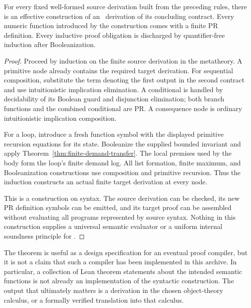 \begin{theorem}
\label{thm:syntactic-compilation}
For every fixed well-formed source derivation built from the preceding rules,
there is an effective construction of an \ipra\ derivation of its concluding
contract.  Every numeric function introduced by the construction comes with
a finite PR definition.  Every inductive proof obligation is discharged by
quantifier-free induction after Booleanization.
\end{theorem}

\begin{proof}
Proceed by induction on the finite source derivation in the metatheory.
A primitive node already contains the required target derivation.  For
sequential composition, substitute the term denoting the first output in the
second contract and use intuitionistic implication elimination.  A
conditional is handled by decidability of its Boolean guard and disjunction
elimination; both branch functions and the combined conditional are PR.
A consequence node is ordinary intuitionistic implication composition.

For a loop, introduce a fresh function symbol with the displayed primitive
recursion equations for its state.  Booleanize the supplied bounded invariant
and apply Theorem~\ref{thm:finite-demand-transfer}.  The local premises used
by the body form the loop's finite demand log.  All list formation, finite
maximum, and Booleanization constructions use composition and primitive
recursion.  Thus the induction constructs an actual finite target derivation
at every node.

This is a construction on syntax.  The source derivation can be checked, its
new PR definition symbols can be emitted, and its target proof can be
assembled without evaluating all programs represented by source syntax.
Nothing in this construction supplies a universal semantic evaluator or a
uniform internal soundness principle for \ipra.
\end{proof}

The theorem is useful as a design specification for an eventual proof
compiler, but it is not a claim that such a compiler has been implemented in
this archive.  In particular, a collection of Lean theorem statements about
the intended semantic functions is not already an implementation of the
syntactic construction.  The output that ultimately matters is a derivation
in the chosen object-theory calculus, or a formally verified translation
into that calculus.

